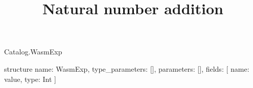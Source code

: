 \begin{lexlean}{Catalog.WasmExp}
\title{Natural number addition}
\begin{semanticmodule}
structure{
  name: WasmExp,
  type_parameters: [],
  parameters: [],
  fields: [
    {name: value, type: Int}
  ]
}
\end{semanticmodule}
\end{lexlean}
